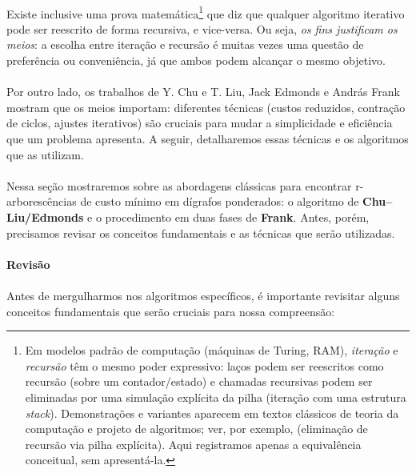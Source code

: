 \documentclass[12pt,a4paper]{article}
\begin{document}
\paragraph{}
Existe inclusive uma prova matemática\footnote{Em modelos padrão de computação (máquinas de Turing, RAM), \emph{iteração} e \emph{recursão} têm o mesmo poder expressivo: laços podem ser reescritos como recursão (sobre um contador/estado) e chamadas recursivas podem ser eliminadas por uma simulação explícita da pilha (iteração com uma estrutura \textit{stack}). Demonstrações e variantes aparecem em textos clássicos de teoria da computação e projeto de algoritmos; ver, por exemplo, \cite{cormen2009} (eliminação de recursão via pilha explícita). Aqui registramos apenas a equivalência conceitual, sem apresentá-la.} que diz que qualquer algoritmo iterativo pode ser reescrito de forma recursiva, e vice-versa. Ou seja, \emph{os fins justificam os meios}: a escolha entre iteração e recursão é muitas vezes uma questão de preferência ou conveniência, já que ambos podem alcançar o mesmo objetivo.

\paragraph{}
Por outro lado, os trabalhos de Y. Chu e T. Liu, Jack Edmonds e András Frank mostram que os meios importam: diferentes técnicas (custos reduzidos, contração de ciclos, ajustes iterativos) são cruciais para mudar a simplicidade e eficiência que um problema apresenta. A seguir, detalharemos essas técnicas e os algoritmos que as utilizam.

\paragraph{}
Nessa seção mostraremos sobre as abordagens clássicas para encontrar r-arborescências de custo mínimo em dígrafos ponderados: o algoritmo de \textbf{Chu–Liu/Edmonds} e o procedimento em duas fases de \textbf{Frank}. Antes, porém, precisamos revisar os conceitos fundamentais e as técnicas que serão utilizadas.

\paragraph{Revisão}

\paragraph{}
Antes de mergulharmos nos algoritmos específicos, é importante revisitar alguns conceitos fundamentais que serão cruciais para nossa compreensão:
\end{document}
